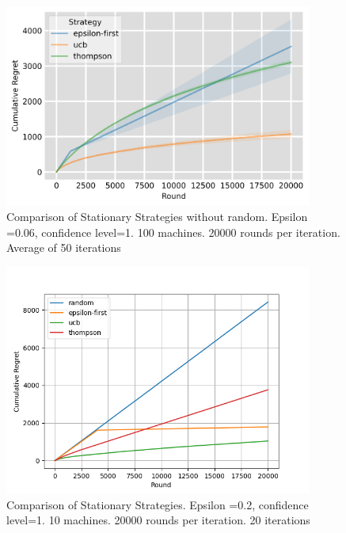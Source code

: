 \begin{figure}
  \centering
    \includegraphics[width=0.9\textwidth]{figures/plot1.png}
    \caption[Comparison of Stationary Strategies without random]{Comparison of Stationary Strategies without random. Epsilon =0.06, confidence level=1. 100 machines. 20000 rounds per iteration. Average of 50 iterations}
    \label{fig: all1}
\end{figure}

\begin{figure}
  \centering
    \includegraphics[width=0.9\textwidth]{figures/10machines.png}
    \caption[Comparison for 10 machines]{Comparison of Stationary Strategies. Epsilon =0.2, confidence level=1. 10 machines. 20000 rounds per iteration. 20 iterations}
    \label{fig: all3}
\end{figure}

